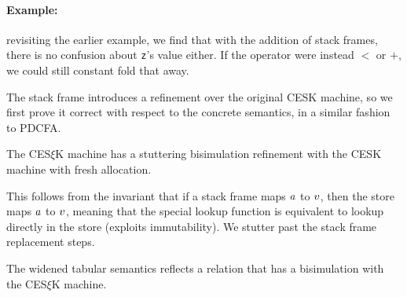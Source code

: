 
\paragraph{Example:} revisiting the earlier example, we find that with the addition of stack frames, there is no confusion about \texttt{z}'s value either.
%
If the operator were instead $<$ or $+$, we could still constant fold that away.

The stack frame introduces a refinement over the original CESK machine, so we first prove it correct with respect to the concrete semantics, in a similar fashion to PDCFA.
%
\begin{theorem}\label{thm:refinement}
  The CES$\xi$K machine has a stuttering bisimulation refinement with the CESK machine with fresh allocation.
\end{theorem}
This follows from the invariant that if a stack frame maps $a$ to $v$, then the store maps $a$ to $v$, meaning that the special lookup function is equivalent to lookup directly in the store (exploits immutability).
%
We stutter past the stack frame replacement steps.
%
%
%
%
%

\begin{theorem}\label{thm:cfa2}
  The widened tabular semantics reflects a relation that has a bisimulation with the CES$\xi$K machine.
\end{theorem}

